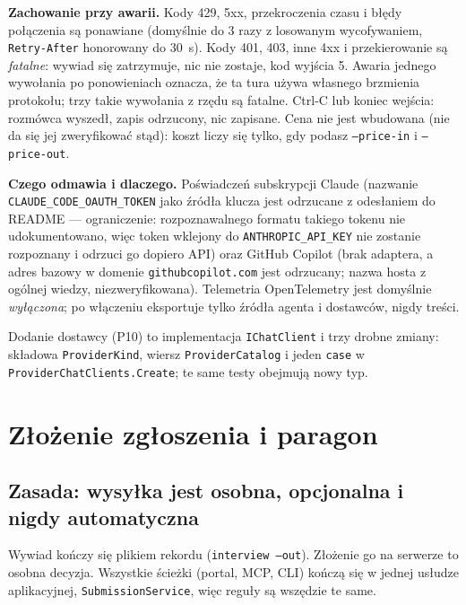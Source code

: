 \textbf{Zachowanie przy awarii.} Kody 429, 5xx, przekroczenia czasu i błędy
połączenia są ponawiane (domyślnie do 3 razy z losowanym wycofywaniem,
\texttt{Retry-After} honorowany do 30~s). Kody 401, 403, inne 4xx i
przekierowanie są \emph{fatalne}: wywiad się zatrzymuje, nic nie zostaje,
kod wyjścia 5. Awaria jednego wywołania po ponowieniach oznacza, że ta tura
używa własnego brzmienia protokołu; trzy takie wywołania z rzędu są fatalne.
Ctrl-C lub koniec wejścia: rozmówca wyszedł, zapis odrzucony, nic zapisane.
Cena nie jest wbudowana (nie da się jej zweryfikować stąd): koszt liczy się
tylko, gdy podasz \texttt{--price-in} i \texttt{--price-out}.

\textbf{Czego odmawia i dlaczego.} Poświadczeń subskrypcji Claude (nazwanie
\texttt{CLAUDE\_CODE\_}\allowbreak\texttt{OAUTH\_TOKEN} jako źródła klucza jest odrzucane
z odesłaniem do README --- ograniczenie: rozpoznawalnego formatu takiego tokenu
nie udokumentowano, więc token wklejony do \texttt{ANTHROPIC\_API\_KEY} nie
zostanie rozpoznany i odrzuci go dopiero API) oraz GitHub Copilot (brak
adaptera, a adres bazowy w domenie \texttt{githubcopilot.com} jest odrzucany;
nazwa hosta z ogólnej wiedzy, niezweryfikowana). Telemetria OpenTelemetry jest
domyślnie \emph{wyłączona}; po włączeniu eksportuje tylko źródła agenta
i dostawców, nigdy treści.

Dodanie dostawcy (P10) to implementacja \texttt{IChatClient} i trzy drobne
zmiany: składowa \texttt{Provider}\allowbreak\texttt{Kind}, wiersz \texttt{Provider}\allowbreak\texttt{Catalog} i jeden
\texttt{case} w \texttt{Provider}\allowbreak\texttt{ChatClients.Create}; te same testy obejmują
nowy typ.

\section{Złożenie zgłoszenia i paragon}

\subsection{Zasada: wysyłka jest osobna, opcjonalna i nigdy automatyczna}

Wywiad kończy się plikiem rekordu (\texttt{interview --out}). Złożenie go na
serwerze to osobna decyzja. Wszystkie ścieżki (portal, MCP, CLI) kończą się w
jednej usłudze aplikacyjnej, \texttt{SubmissionService}, więc reguły są
wszędzie te same.

